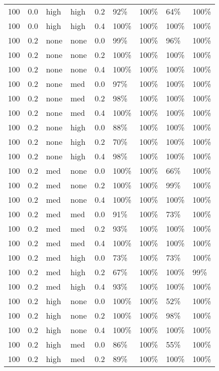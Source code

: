 \begin{longtable}{rrllrllll}
  100 & 0.0 & high & high & 0.2 & 92\% & 100\% & 64\% & 100\% \\ 
  100 & 0.0 & high & high & 0.4 & 100\% & 100\% & 100\% & 100\% \\ 
  100 & 0.2 & none & none & 0.0 & 99\% & 100\% & 96\% & 100\% \\ 
  100 & 0.2 & none & none & 0.2 & 100\% & 100\% & 100\% & 100\% \\ 
  100 & 0.2 & none & none & 0.4 & 100\% & 100\% & 100\% & 100\% \\ 
  100 & 0.2 & none & med & 0.0 & 97\% & 100\% & 100\% & 100\% \\ 
  100 & 0.2 & none & med & 0.2 & 98\% & 100\% & 100\% & 100\% \\ 
  100 & 0.2 & none & med & 0.4 & 100\% & 100\% & 100\% & 100\% \\ 
  100 & 0.2 & none & high & 0.0 & 88\% & 100\% & 100\% & 100\% \\ 
  100 & 0.2 & none & high & 0.2 & 70\% & 100\% & 100\% & 100\% \\ 
  100 & 0.2 & none & high & 0.4 & 98\% & 100\% & 100\% & 100\% \\ 
  100 & 0.2 & med & none & 0.0 & 100\% & 100\% & 66\% & 100\% \\ 
  100 & 0.2 & med & none & 0.2 & 100\% & 100\% & 99\% & 100\% \\ 
  100 & 0.2 & med & none & 0.4 & 100\% & 100\% & 100\% & 100\% \\ 
  100 & 0.2 & med & med & 0.0 & 91\% & 100\% & 73\% & 100\% \\ 
  100 & 0.2 & med & med & 0.2 & 93\% & 100\% & 100\% & 100\% \\ 
  100 & 0.2 & med & med & 0.4 & 100\% & 100\% & 100\% & 100\% \\ 
  100 & 0.2 & med & high & 0.0 & 73\% & 100\% & 73\% & 100\% \\ 
  100 & 0.2 & med & high & 0.2 & 67\% & 100\% & 100\% & 99\% \\ 
  100 & 0.2 & med & high & 0.4 & 93\% & 100\% & 100\% & 100\% \\ 
  100 & 0.2 & high & none & 0.0 & 100\% & 100\% & 52\% & 100\% \\ 
  100 & 0.2 & high & none & 0.2 & 100\% & 100\% & 98\% & 100\% \\ 
  100 & 0.2 & high & none & 0.4 & 100\% & 100\% & 100\% & 100\% \\ 
  100 & 0.2 & high & med & 0.0 & 86\% & 100\% & 55\% & 100\% \\ 
  100 & 0.2 & high & med & 0.2 & 89\% & 100\% & 100\% & 100\% \\ 

\end{longtable}

